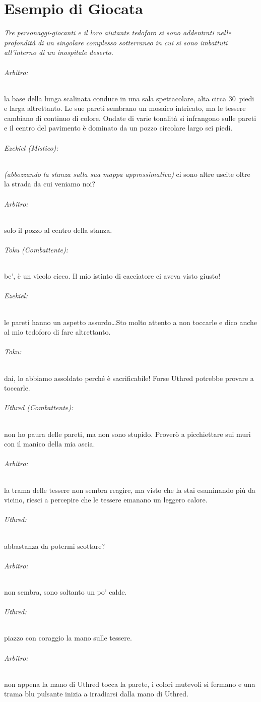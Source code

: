 \documentclass[itdr]{subfiles}
\begin{document}
\chapter{Esempio di Giocata}
\label{ch:esempio_di_giocata}
{

{\em Tre personaggi-giocanti e il loro aiutante tedoforo si sono addentrati nelle profondità di un singolare complesso sotterraneo in cui si sono imbattuti all'interno di un inospitale deserto.}

\vspace{1ex}

\subparagraph{Arbitro:} la base della lunga scalinata conduce in una sala spettacolare, alta circa 30~piedi e larga altrettanto. Le sue pareti sembrano un mosaico intricato, ma le tessere cambiano di continuo di colore. Ondate di varie tonalità si infrangono sulle pareti e il centro del pavimento è dominato da un pozzo circolare largo sei piedi.

\subparagraph{Ezekiel (Mistico):} {\em (abbozzando la stanza sulla sua mappa approssimativa)} ci sono altre uscite oltre la strada da cui veniamo noi?

\subparagraph{Arbitro:} solo il pozzo al centro della stanza.

\subparagraph{Toku (Combattente):} be', è un vicolo cieco. Il mio istinto di cacciatore ci aveva visto giusto!

\subparagraph{Ezekiel:} le pareti hanno un aspetto assurdo\ldots Sto molto attento a non toccarle e dico anche al mio tedoforo di fare altrettanto.

\subparagraph{Toku:} dai, lo abbiamo assoldato perché è sacrificabile! Forse Uthred potrebbe provare a toccarle.

\subparagraph{Uthred (Combattente):} non ho paura delle pareti, ma non sono stupido. Proverò a picchiettare sui muri con il manico della mia ascia.

\subparagraph{Arbitro:} la trama delle tessere non sembra reagire, ma visto che la stai esaminando più da vicino, riesci a percepire che le tessere emanano un leggero calore.

\subparagraph{Uthred:} abbastanza da potermi scottare?

\subparagraph{Arbitro:} non sembra, sono soltanto un po' calde.

\subparagraph{Uthred:} piazzo con coraggio la mano sulle tessere.

\subparagraph{Arbitro:} non appena la mano di Uthred tocca la parete, i colori mutevoli si fermano e una trama blu pulsante inizia a irradiarsi dalla mano di Uthred.

}
\end{document}
